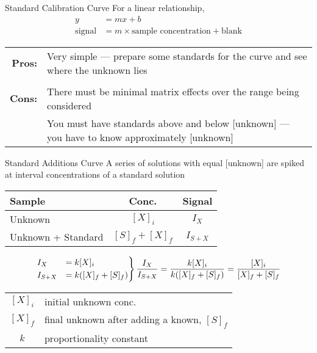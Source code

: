 \documentclass[notes=only]{beamer}
\begin{document}
\begin{frame}{Standard Calibration Curve}
	For a \alert{linear} relationship,
	\begin{align*}
		y &= mx + b \\
		\text{signal} &= m \times \text{sample concentration} +
		\text{blank}
	\end{align*}

	\begin{tabularx}{\linewidth} {>{\bfseries}r X}
		Pros: &
		Very simple --- prepare some standards for the curve
		and see where the unknown lies \\ \\
		Cons: &
		There must be minimal \alert{matrix effects} over the
		range being considered \\
		      & You must have standards above and below
		      [unknown] --- you
			have to know approximately [unknown] \\
	\end{tabularx}
\end{frame}

\begin{frame}[t]{Standard Additions Curve}
	A series of solutions with equal [unknown] are spiked at
	interval concentrations of a standard solution

	\begin{center}
	\begin{tabular} {l c c}
		\toprule
		\bfseries Sample & \bfseries Conc. & \bfseries Signal \\ \midrule
		Unknown & $[X]_i$ & $I_X$ \\
		Unknown + Standard & $[S]_f + [X]_f$ & $I_{S+X}$ \\ \bottomrule
	\end{tabular}
	\end{center}

	\begin{align*}
		\begin{rcases}
		I_X &= k[X]_i \\
		I_{S+X} &= k([X]_f + [S]_f)
		\end{rcases} \dfrac{I_X}{I_{S+X}} = \dfrac{k[X]_i}{k([X]_f +
		[S]_f)} = \dfrac{[X]_i}{[X]_f + [S]_f}
	\end{align*}

	\begin{center}
	\begin{tabular} {c l}
		$[X]_i$ & initial unknown conc. \\
		$[X]_f$ & final unknown after adding a known, $[S]_f$ \\
		$k$ & proportionality constant
	\end{tabular}
	\end{center}
\end{frame}
\end{document}
